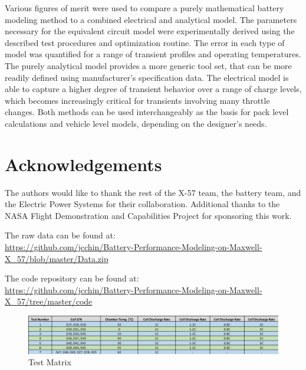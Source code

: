 \documentclass[]{aiaa-tc}%
\begin{document}
Various figures of merit were used to compare a purely mathematical battery modeling method to a combined electrical and analytical model. The parameters necessary for the equivalent circuit model were experimentally derived using the described test procedures and optimization routine. The error in each type of model was quantified for a range of transient profiles and operating temperatures. The purely analytical model provides a more generic tool set, that can be more readily defined using manufacturer's specification data. The electrical model is able to capture a higher degree of transient behavior over a range of charge levels, which becomes increasingly critical for transients involving many throttle changes. Both methods can be used interchangeably as the basis for pack level calculations and vehicle level models, depending on the designer's needs.


\section{Acknowledgements}

The authors would like to thank the rest of the X-57 team, the battery team, and the Electric Power Systems for their collaboration. Additional thanks to the NASA Flight Demonstration and Capabilities Project for sponsoring this work.





\pagebreak
The raw data can be found at:\\
\url{https://github.com/jcchin/Battery-Performance-Modeling-on-Maxwell-X_57/blob/master/Data.zip}

The code repository can be found at:\\
\url{https://github.com/jcchin/Battery-Performance-Modeling-on-Maxwell-X_57/tree/master/code}


\begin{figure}[!htb]
	\centering
	\includegraphics[width=1.0\textwidth]{figures/Test_Matrix.png}
	\caption{Test Matrix}
	\label{fig:TestMatrix}
\end{figure}
\end{document}
